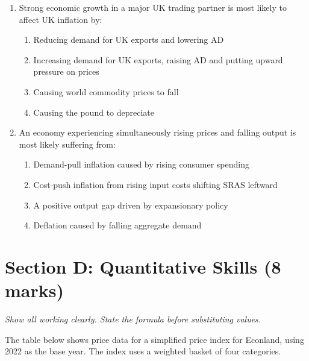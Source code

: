 \documentclass[12pt,a4paper]{article}
\begin{document}
\begin{enumerate}[leftmargin=*, label=\textbf{\arabic*.}]
    \vspace{0.4em}

    \item Strong economic growth in a major UK trading partner is most likely to affect UK inflation by:
    \begin{enumerate}[label=(\Alph*), topsep=2pt]
        \item Reducing demand for UK exports and lowering AD
        \item Increasing demand for UK exports, raising AD and putting upward pressure on prices
        \item Causing world commodity prices to fall
        \item Causing the pound to depreciate
    \end{enumerate}

    \vspace{0.4em}

    \item An economy experiencing simultaneously rising prices and falling output is most likely suffering from:
    \begin{enumerate}[label=(\Alph*), topsep=2pt]
        \item Demand-pull inflation caused by rising consumer spending
        \item Cost-push inflation from rising input costs shifting SRAS leftward
        \item A positive output gap driven by expansionary policy
        \item Deflation caused by falling aggregate demand
    \end{enumerate}

\end{enumerate}

\newpage

\section*{Section D: Quantitative Skills (8 marks)}

\textit{Show all working clearly. State the formula before substituting values.}

\vspace{0.8em}

The table below shows price data for a simplified price index for Econland, using 2022 as the base year. The index uses a weighted basket of four categories.
\end{document}
